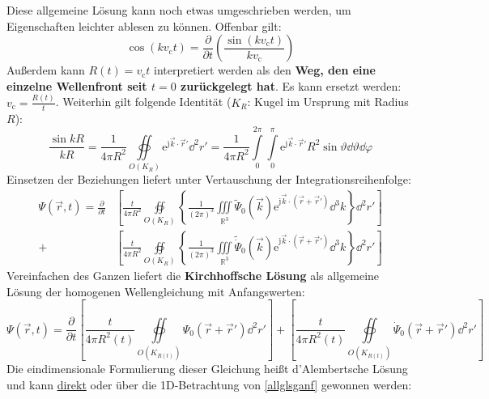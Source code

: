 		   Diese allgemeine Lösung kann noch etwas umgeschrieben werden, um Eigenschaften leichter ablesen zu können. Offenbar gilt: \begin{equation}\cos( k v_\mathrm{c}t)  = \frac{\partial}{\partial t}\left( \frac{\sin( k v_\mathrm{c}t)}{ k v_\mathrm{c}} \right)\end{equation}
		   Außerdem kann \textbf{\(R(t) =  v_\mathrm{c}t \)} interpretiert werden als den \textbf{Weg, den eine einzelne Wellenfront seit \(t=0\) zurückgelegt hat}. Es kann ersetzt werden: \(  v_\mathrm{c} = \frac{R(t)}{t}\).
		   Weiterhin gilt folgende Identität (\(K_R\): Kugel im Ursprung mit Radius $R$):
		        \begin{equation}
			        \frac{\sin  k R}{ k R} = \frac{1}{4\pi R^2} \oiint\limits_{O(K_R)}  \mathrm{e}^{\mathrm{j}\vec{k} \cdot \vec{r} '} \dd^2 r' = \frac{1}{4\pi R^2} \int\limits_0^{2\pi}\int\limits_0^\pi  \mathrm{e}^{\mathrm{j}\vec{k} \cdot \vec{r} '} R^2\sin\vartheta\dd\vartheta\dd\varphi
		        \end{equation}
		   Einsetzen der Beziehungen liefert unter Vertauschung der Integrationsreihenfolge: 
		        \begin{equation}\begin{split}
				        \Psi(\vec{r} , t) = \frac{\partial}{\partial t} &\left[ \frac{t}{4\pi R^2} \oiint\limits_{O(K_R)} \left\{ \frac{1}{(2\pi)^3}\iiint\limits_{\mathbb{R}^3}  \tilde{\Psi}_0(\vec{k})  \mathrm{e}^{\mathrm{j}\vec{k} \cdot (\vec{r} +\vec{r} ')} \dd^3 k\right\} \dd^2 r' \right] \\
				        + &\left[ \frac{t}{4\pi R^2} \oiint\limits_{O(K_R)} \left\{ \frac{1}{(2\pi)^3}\iiint\limits_{\mathbb{R}^3}  \tilde{\dot{\Psi}}_0(\vec{k})  \mathrm{e}^{\mathrm{j}\vec{k} \cdot (\vec{r} +\vec{r} ')} \dd^3 k\right\} \dd^2 r' \right]
			        \end{split}\end{equation}
Vereinfachen des Ganzen liefert die \textbf{Kirchhoffsche Lösung} als allgemeine Lösung der homogenen Wellengleichung mit Anfangswerten:
		        \begin{equation}
			        \boxed{\Psi(\vec{r} , t) = \frac{\partial}{\partial t} \left[ \frac{t}{4\pi R^2(t)} \oiint\limits_{O(K_{R(t)})} \Psi_0(\vec{r} +\vec{r} ') \dd^2 r' \right]
				        + \left[ \frac{t}{4\pi R^2(t)} \oiint\limits_{O(K_{R(t)})} \dot{\Psi}_0(\vec{r} +\vec{r} ') \dd^2 r' \right]}
		        \end{equation}
		        Die eindimensionale Formulierung dieser Gleichung heißt d'Alembertsche Lösung und kann \href{https://de.wikipedia.org/wiki/Wellengleichung#Die_Wellengleichung_in_einer_r%C3%A4umlichen_Dimension}{direkt} oder über die 1D-Betrachtung von \ref{allglsganf} gewonnen werden:
